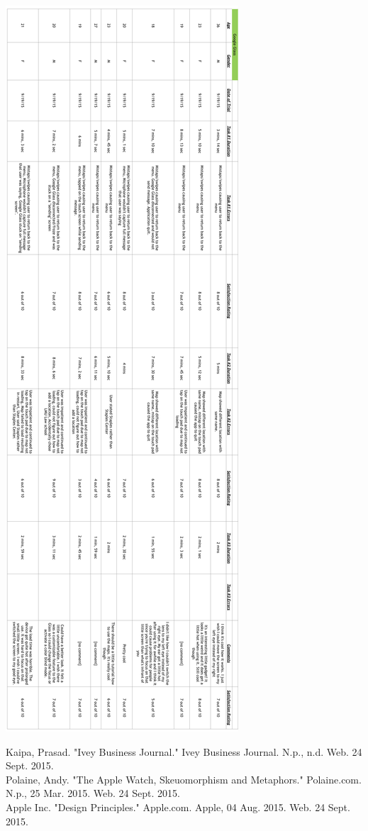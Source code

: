 \documentclass[paper=a4, fontsize=11pt]{scrartcl}	%
\numberwithin{equation}{section}															%
\numberwithin{figure}{section}																%
\numberwithin{table}{section}																%
\begin{document}
\includegraphics[scale=0.45]{sources2}

\newpage
Kaipa, Prasad. "Ivey Business Journal." Ivey Business Journal. N.p., n.d. Web. 24 Sept. 2015.\\

Polaine, Andy. "The Apple Watch, Skeuomorphism and Metaphors." Polaine.com. N.p., 25 Mar. 2015. Web. 24 Sept. 2015.\\

Apple Inc. "Design Principles." Apple.com. Apple, 04 Aug. 2015. Web. 24 Sept. 2015.
\end{document}
